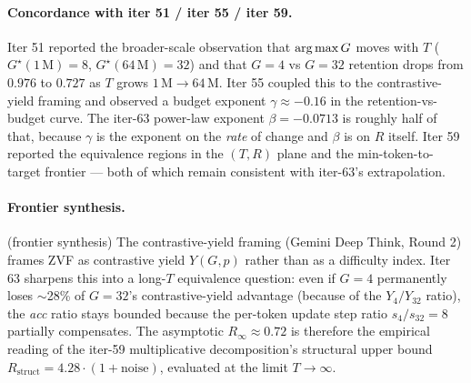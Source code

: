 \paragraph{Concordance with iter 51 / iter 55 / iter 59.}
Iter 51 reported the broader-scale observation that $\operatorname*{arg\,max} G$ moves
with $T$ ($G^\star(1\,\mathrm{M}) = 8$, $G^\star(64\,\mathrm{M}) = 32$)
and that $G{=}4$ vs $G{=}32$ retention drops from $0.976$ to $0.727$
as $T$ grows $1\,\mathrm{M} \to 64\,\mathrm{M}$.  Iter 55 coupled this
to the contrastive-yield framing and observed a budget exponent
$\gamma \approx -0.16$ in the retention-vs-budget curve.  The iter-63
power-law exponent $\beta = -0.0713$ is roughly half of that, because
$\gamma$ is the exponent on the \emph{rate} of change and $\beta$ is
on $R$ itself.  Iter 59 reported the equivalence regions in the
$(T, R)$ plane and the min-token-to-target frontier --- both of which
remain consistent with iter-63's extrapolation.

\paragraph{Frontier synthesis.}
(frontier synthesis) The contrastive-yield framing (Gemini Deep Think,
Round 2) frames ZVF as contrastive yield $Y(G, p)$ rather than as a
difficulty index.  Iter 63 sharpens this into a long-$T$ equivalence
question: even if $G{=}4$ permanently loses $\sim$28\% of $G{=}32$'s
contrastive-yield advantage (because of the $Y_4/Y_{32}$ ratio), the
\emph{acc} ratio stays bounded because the per-token update step
ratio $s_4/s_{32} = 8$ partially compensates.  The asymptotic
$R_\infty \approx 0.72$ is therefore the empirical reading of the
iter-59 multiplicative decomposition's structural upper bound
$R_{\mathrm{struct}} = 4.28 \cdot (1 + \mathrm{noise})$, evaluated
at the limit $T \to \infty$.
